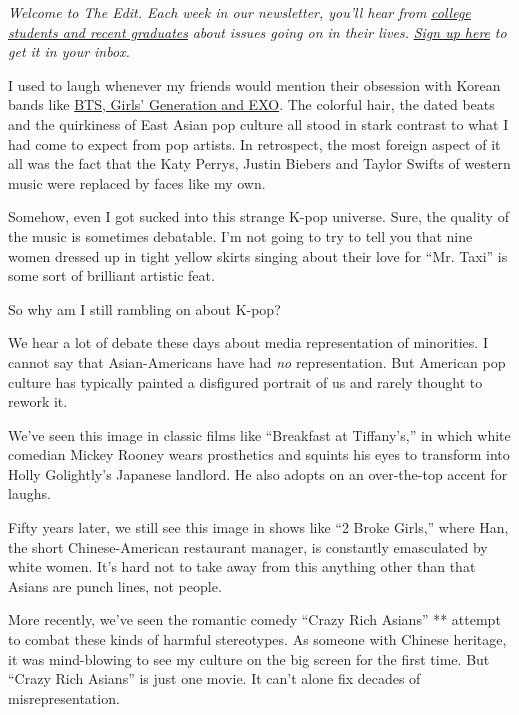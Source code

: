 \emph{Welcome to The Edit. Each week in our newsletter, you'll hear
from}
\href{https://www.nytimes.com/2018/08/28/smarter-living/the-edit-contributors.html?module=inline}{\emph{college
students and recent graduates}} \emph{about issues going on in their
lives.}
\href{https://www.nytimes.com/newsletters/the-edit?module=inline}{\emph{Sign
up here}} \emph{to get it in your inbox.}

I used to laugh whenever my friends would mention their obsession with
Korean bands like
\href{https://www.nytimes.com/2018/02/07/arts/music/k-pop-olympics-korea.html}{BTS,
Girls' Generation and EXO}. The colorful hair, the dated beats and the
quirkiness of East Asian pop culture all stood in stark contrast to what
I had come to expect from pop artists. In retrospect, the most foreign
aspect of it all was the fact that the Katy Perrys, Justin Biebers and
Taylor Swifts of western music were replaced by faces like my own.

Somehow, even I got sucked into this strange K-pop universe. Sure, the
quality of the music is sometimes debatable. I'm not going to try to
tell you that nine women dressed up in tight yellow skirts singing about
their love for ``Mr. Taxi'' is some sort of brilliant artistic feat.

So why am I still rambling on about K-pop?

We hear a lot of debate these days about media representation of
minorities. I cannot say that Asian-Americans have had \emph{no}
representation. But American pop culture has typically painted a
disfigured portrait of us and rarely thought to rework it.

We've seen this image in classic films like ``Breakfast at Tiffany's,''
in which white comedian Mickey Rooney wears prosthetics and squints his
eyes to transform into Holly Golightly's Japanese landlord. He also
adopts on an over-the-top accent for laughs.

Fifty years later, we still see this image in shows like ``2 Broke
Girls,'' where Han, the short Chinese-American restaurant manager, is
constantly emasculated by white women. It's hard not to take away from
this anything other than that Asians are punch lines, not people.

More recently, we've seen the romantic comedy ``Crazy Rich Asians'' **
attempt to combat these kinds of harmful stereotypes. As someone with
Chinese heritage, it was mind-blowing to see my culture on the big
screen for the first time. But ``Crazy Rich Asians'' is just one movie.
It can't alone fix decades of misrepresentation.

